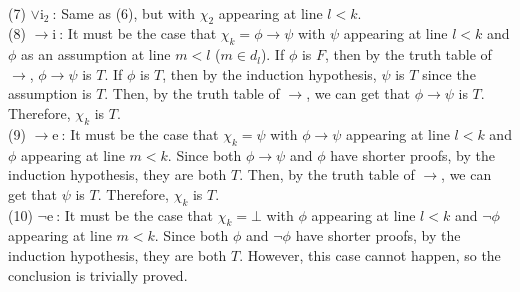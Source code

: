 \documentclass{article}
\def\intro{\mathrm{i\ }}
\def\elim{\mathrm{e\ }}
\def\introb{\mathrm{i_2\ }}
\def\toe{\to\elim}
\def\toi{\to\intro}
\def\orib{\lor\introb}
\def\nege{\neg\elim}
\begin{document}
\\[1em]
(7) $\orib$: Same as (6), but with $\chi_2$ appearing at line $l < k$.
\\[1em]
(8) $\toi$: It must be the case that $\chi_k = \phi \to \psi$ with $\psi$ appearing at line $l < k$ and $\phi$ as an assumption at line $m < l$ ($m \in d_l$). If $\phi$ is $F$, then by the truth table of $\to$, $\phi \to \psi$ is $T$. If $\phi$ is $T$, then by the induction hypothesis, $\psi$ is $T$ since the assumption is $T$. Then, by the truth table of $\to$, we can get that $\phi \to \psi$ is $T$. Therefore, $\chi_k$ is $T$.
\\[1em]
(9) $\toe$: It must be the case that $\chi_k = \psi$ with $\phi \to \psi$ appearing at line $l < k$ and $\phi$ appearing at line $m < k$. Since both $\phi \to \psi$ and $\phi$ have shorter proofs, by the induction hypothesis, they are both $T$. Then, by the truth table of $\to$, we can get that $\psi$ is $T$. Therefore, $\chi_k$ is $T$.
\\[1em]
(10) $\nege$: It must be the case that $\chi_k = \bot$ with $\phi$ appearing at line $l < k$ and $\neg\phi$ appearing at line $m < k$. Since both $\phi$ and $\neg\phi$ have shorter proofs, by the induction hypothesis, they are both $T$. However, this case cannot happen, so the conclusion is trivially proved.
\end{document}
